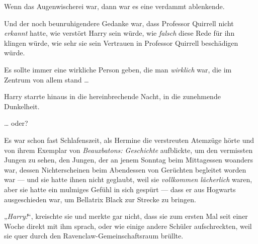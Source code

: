Wenn das Augenwischerei war, dann war es eine verdammt ablenkende.

Und der noch beunruhigendere Gedanke war, dass Professor Quirrell nicht \emph{erkannt} hatte, wie verstört Harry sein würde, wie \emph{falsch} diese Rede für ihn klingen würde, wie sehr sie sein Vertrauen in Professor Quirrell beschädigen würde.

Es sollte immer eine wirkliche Person geben, die man \emph{wirklich} war, die im Zentrum von allem stand …

Harry starrte hinaus in die hereinbrechende Nacht, in die zunehmende Dunkelheit.

… oder?

\later

Es war schon fast Schlafenszeit, als Hermine die verstreuten Atemzüge hörte und von ihrem Exemplar von \emph{Beauxbatons: Geschichte} aufblickte, um den vermissten Jungen zu sehen, den Jungen, der an jenem Sonntag beim Mittagessen woanders war, dessen Nichterscheinen beim Abendessen von Gerüchten begleitet worden war — und sie hatte ihnen nicht geglaubt, weil sie \emph{vollkommen} \emph{lächerlich} waren, aber sie hatte ein mulmiges Gefühl in sich gespürt — dass er aus Hogwarts ausgeschieden war, um Bellatrix Black zur Strecke zu bringen.

„\emph{Harry!}“, kreischte sie und merkte gar nicht, dass sie zum ersten Mal seit einer Woche direkt mit ihm sprach, oder wie einige andere Schüler aufschreckten, weil sie quer durch den Ravenclaw-Gemeinschaftsraum brüllte.

